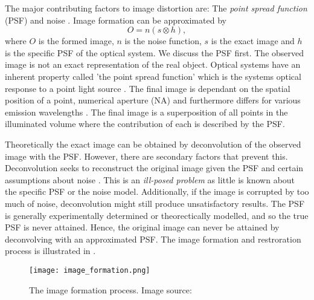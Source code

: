 \begin{definition}[Image distortion]
	The major contributing factors to image distortion are: The \textit{point spread function} (PSF) and noise \citep{Sarder2006}.
	Image formation can be approximated by 
	\begin{equation}
		O = n(s \otimes h),
	\end{equation}
	where $O$ is the formed image, $n$ is the noise function, $s$ is the exact image and $h$ is the specific PSF of the optical system.
	We discuss the PSF first.
	The observed image is not an exact representation of the real object.
	Optical systems have an inherent property called 'the point spread function' which is the systems optical response to a point light source \citep{Danek2012}.
	The final image is dependant on the spatial position of a point, numerical aperture (NA) and furthermore differs for various emission wavelengths \citep{Hubeny2008,Keuper2012}.
	The final image is a superposition of all points in the illuminated volume where the contribution of each is described by the PSF.
	
	Theoretically the exact image can be obtained by deconvolution of the observed image with the PSF.
	However, there are secondary factors that prevent this.
	Deconvolution seeks to reconstruct the original image given the PSF and certain assumptions about noise \citep{Keuper2012}.
	This is an \textit{ill-posed problem} as little is known about the specific PSF or the noise model.
	Additionally, if the image is corrupted by too much of noise, deconvolution might still produce unsatisfactory results.
	The PSF is generally experimentally determined or theorectically modelled, and so the true PSF is never attained.
	Hence, the original image can never be attained by deconvolving with an approximated PSF.
	The image formation and restroration process is illustrated in .
	
	\begin{figure}[!t]
		\centering
		\texttt{[image: image\_formation.png]}
		\caption{The image formation process. Image source: \citep{cil:40968}}
		\label{fig:imageformation}
	\end{figure}
	

\end{definition}
